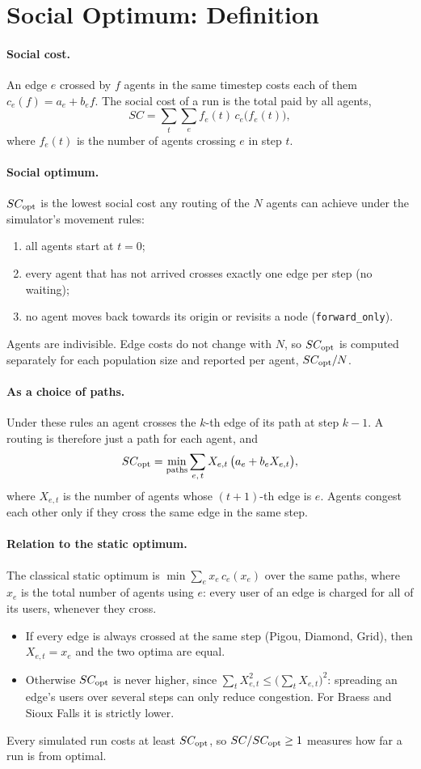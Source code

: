 \documentclass[11pt]{article}
\begin{document}
\section{Social Optimum: Definition}

\paragraph{Social cost.} An edge $e$ crossed by $f$ agents in the same timestep costs each of them
$c_e(f) = a_e + b_e f$. The social cost of a run is the total paid by all agents,
\[
  SC = \sum_t \sum_e f_e(t)\, c_e\bigl(f_e(t)\bigr),
\]
where $f_e(t)$ is the number of agents crossing $e$ in step $t$.

\paragraph{Social optimum.} $SC_{\mathrm{opt}}$ is the lowest social cost any routing of the $N$ agents can achieve
under the simulator's movement rules:
\begin{enumerate}
  \item all agents start at $t = 0$;
  \item every agent that has not arrived crosses exactly one edge per step (no waiting);
  \item no agent moves back towards its origin or revisits a node (\texttt{forward\_only}).
\end{enumerate}
Agents are indivisible. Edge costs do not change with $N$, so $SC_{\mathrm{opt}}$ is computed separately for each
population size and reported per agent, $SC_{\mathrm{opt}}/N$.

\paragraph{As a choice of paths.} Under these rules an agent crosses the $k$-th edge of its path at step
$k - 1$. A routing is therefore just a path for each agent, and
\[
  SC_{\mathrm{opt}} = \min_{\text{paths}} \sum_{e,\,t} X_{e,t}\,\bigl(a_e + b_e X_{e,t}\bigr),
\]
where $X_{e,t}$ is the number of agents whose $(t{+}1)$-th edge is $e$. Agents congest each other only if
they cross the same edge in the same step.

\paragraph{Relation to the static optimum.} The classical static optimum is
$\min \sum_e x_e\, c_e(x_e)$ over the same paths, where $x_e$ is the total number of agents using $e$:
every user of an edge is charged for all of its users, whenever they cross.
\begin{itemize}
  \item If every edge is always crossed at the same step (Pigou, Diamond, Grid), then $X_{e,t} = x_e$ and
        the two optima are equal.
  \item Otherwise $SC_{\mathrm{opt}}$ is never higher, since $\sum_t X_{e,t}^2 \le \bigl(\sum_t X_{e,t}\bigr)^2$:
        spreading an edge's users over several steps can only reduce congestion. For Braess and Sioux
        Falls it is strictly lower.
\end{itemize}
Every simulated run costs at least $SC_{\mathrm{opt}}$, so $SC/SC_{\mathrm{opt}} \ge 1$ measures how far a run is from optimal.
\end{document}
